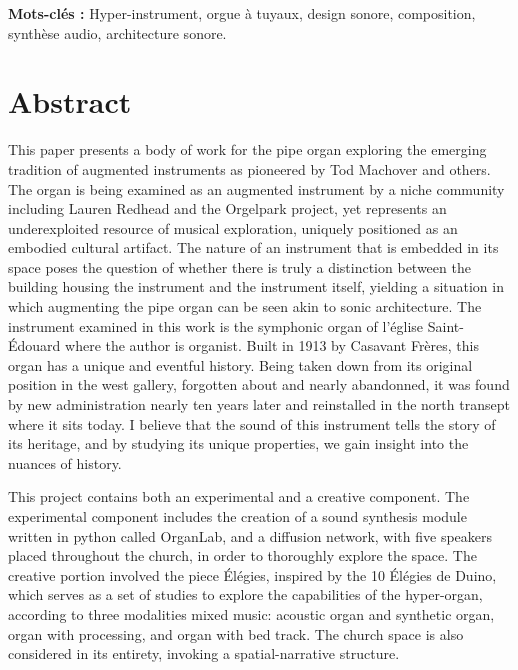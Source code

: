 \documentclass[12pt,twoside,maitrise]{dms_ks}
\theoremstyle{definition}
\begin{document}
\textbf{Mots-clés :} Hyper-instrument, orgue à tuyaux, design sonore, composition, synthèse audio, architecture sonore.


\anglais

\chapter*{Abstract}

This paper presents a body of work for the pipe organ exploring the emerging tradition of augmented instruments as pioneered by Tod Machover and others. 
The organ is being examined as an augmented instrument by a niche community including Lauren Redhead and the Orgelpark project, yet represents an underexploited resource of musical exploration, uniquely positioned as an embodied cultural artifact. 
The nature of an instrument that is embedded in its space poses the question of whether there is truly a distinction between the building housing the instrument and the instrument itself, yielding a situation in which augmenting the pipe organ can be seen akin to sonic architecture. 
The instrument examined in this work is the symphonic organ of l'église Saint-Édouard where the author is organist. 
Built in 1913 by Casavant Frères, this organ has a unique and eventful history. 
Being taken down from its original position in the west gallery, forgotten about and nearly abandonned, it was found by new administration nearly ten years later and reinstalled in the north transept where it sits today. 
I believe that the sound of this instrument tells the story of its heritage, and by studying its unique properties, we gain insight into the nuances of history. 

This project contains both an experimental and a creative component. 
The experimental component includes the creation of a sound synthesis module written in python called OrganLab, and a diffusion network, with five speakers placed throughout the church, in order to thoroughly explore the space. 
The creative portion involved the piece Élégies, inspired by the 10 Élégies de Duino, which serves as a set of studies to explore the capabilities of the hyper-organ, according to three modalities mixed music: acoustic organ and synthetic organ, organ with processing, and organ with bed track. 
The church space is also considered in its entirety, invoking a spatial-narrative structure. 
\end{document}
